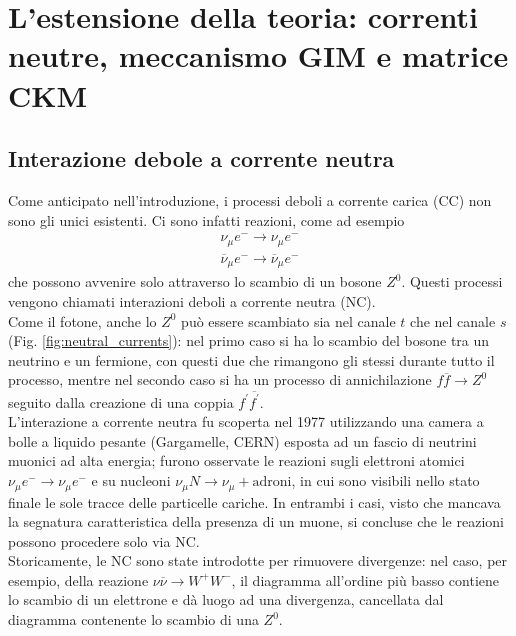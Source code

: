 \documentclass{subnucbo}
\begin{document}
\section{L'estensione della teoria: correnti neutre, meccanismo GIM e matrice CKM}
\label{sec:part_two}
\subsection{Interazione debole a corrente neutra}
\label{subsec:nc}
Come anticipato nell'introduzione, i processi deboli a corrente carica (CC) non sono gli unici esistenti. Ci sono infatti reazioni, come ad esempio
\begin{equation}
        \begin{array} { c } { \nu _ { \mu } e ^ { - } \rightarrow \nu _ { \mu } e ^ { - } } \\ { \overline { \nu } _ { \mu } e ^ { - } \rightarrow \overline { \nu } _ { \mu } e ^ { - } } \end{array}
        \label{eq:neutral_current}
\end{equation}
che possono avvenire solo attraverso lo scambio di un bosone $Z^{0}$. Questi processi vengono chiamati interazioni deboli a corrente neutra (NC). \\
Come il fotone, anche lo $Z^{0}$ può essere scambiato sia nel canale $t$ che nel canale $s$ (Fig. \ref{fig:neutral_currents}): nel primo caso si ha lo scambio del bosone tra un neutrino e un fermione, con questi due che rimangono gli stessi durante tutto il processo, mentre nel secondo caso si ha un processo di annichilazione $f \overline { f } \rightarrow Z ^ { 0 }$ seguito dalla creazione di una coppia $f ^ { \prime } \overline { f ^ { \prime } }$. \\
L'interazione a corrente neutra fu scoperta nel 1977 utilizzando una camera a bolle a liquido pesante (Gargamelle, CERN) esposta ad un fascio di neutrini muonici ad alta energia; furono osservate le reazioni sugli elettroni atomici $\nu _ { \mu } e ^ { - } \rightarrow \nu _ { \mu } e ^ { - }$ e su nucleoni $\nu _ { \mu } N \rightarrow \nu _ { \mu } + \text {adroni}$, in cui sono visibili nello stato finale le sole tracce delle particelle cariche. In entrambi i casi, visto che mancava la segnatura caratteristica della presenza di un muone, si concluse che le reazioni possono procedere solo via NC. \\
Storicamente, le NC sono state introdotte per rimuovere divergenze: nel caso, per esempio, della reazione $\nu \overline { \nu } \rightarrow W ^ { + } W ^ { - }$, il diagramma all'ordine più basso contiene lo scambio di un elettrone e dà luogo ad una divergenza, cancellata dal diagramma contenente lo scambio di una $Z^{0}$. \\
\end{document}
